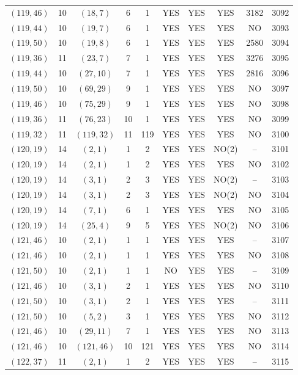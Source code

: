 \begin{longtable}{|c|c|c|c|c|c|c|c|c|c|}
$(119, 46)$ & 10 & $(18, 7)$ & 6 & 1 & YES & YES & YES & 3182 & 3092\\
$(119, 44)$ & 10 & $(19, 7)$ & 6 & 1 & YES & YES & YES & NO & 3093\\
$(119, 50)$ & 10 & $(19, 8)$ & 6 & 1 & YES & YES & YES & 2580 & 3094\\
$(119, 36)$ & 11 & $(23, 7)$ & 7 & 1 & YES & YES & YES & 3276 & 3095\\
$(119, 44)$ & 10 & $(27, 10)$ & 7 & 1 & YES & YES & YES & 2816 & 3096\\
$(119, 50)$ & 10 & $(69, 29)$ & 9 & 1 & YES & YES & YES & NO & 3097\\
$(119, 46)$ & 10 & $(75, 29)$ & 9 & 1 & YES & YES & YES & NO & 3098\\
$(119, 36)$ & 11 & $(76, 23)$ & 10 & 1 & YES & YES & YES & NO & 3099\\
$(119, 32)$ & 11 & $(119, 32)$ & 11 & 119 & YES & YES & YES & NO & 3100\\
$(120, 19)$ & 14 & $(2, 1)$ & 1 & 2 & YES & YES & NO(2) & -- & 3101\\
$(120, 19)$ & 14 & $(2, 1)$ & 1 & 2 & YES & YES & YES & NO & 3102\\
$(120, 19)$ & 14 & $(3, 1)$ & 2 & 3 & YES & YES & NO(2) & -- & 3103\\
$(120, 19)$ & 14 & $(3, 1)$ & 2 & 3 & YES & YES & NO(2) & NO & 3104\\
$(120, 19)$ & 14 & $(7, 1)$ & 6 & 1 & YES & YES & YES & NO & 3105\\
$(120, 19)$ & 14 & $(25, 4)$ & 9 & 5 & YES & YES & NO(2) & NO & 3106\\
$(121, 46)$ & 10 & $(2, 1)$ & 1 & 1 & YES & YES & YES & -- & 3107\\
$(121, 46)$ & 10 & $(2, 1)$ & 1 & 1 & YES & YES & YES & NO & 3108\\
$(121, 50)$ & 10 & $(2, 1)$ & 1 & 1 & NO & YES & YES & -- & 3109\\
$(121, 46)$ & 10 & $(3, 1)$ & 2 & 1 & YES & YES & YES & NO & 3110\\
$(121, 50)$ & 10 & $(3, 1)$ & 2 & 1 & YES & YES & YES & -- & 3111\\
$(121, 50)$ & 10 & $(5, 2)$ & 3 & 1 & YES & YES & YES & NO & 3112\\
$(121, 46)$ & 10 & $(29, 11)$ & 7 & 1 & YES & YES & YES & NO & 3113\\
$(121, 46)$ & 10 & $(121, 46)$ & 10 & 121 & YES & YES & YES & NO & 3114\\
$(122, 37)$ & 11 & $(2, 1)$ & 1 & 2 & YES & YES & YES & -- & 3115\\

\end{longtable}
